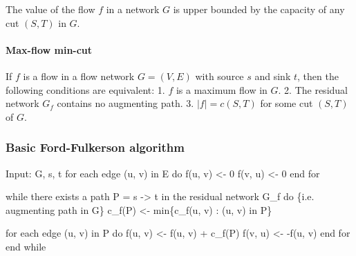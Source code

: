 \documentclass[11pt]{article}
\newenvironment{Shaded}{}{}
\newcommand{\NormalTok}[1]{{#1}}
\begin{document}
The value of the flow \(f\) in a network \(G\) is upper bounded by the
capacity of any cut \((S, T)\) in \(G\).

    \paragraph{Max-flow min-cut}\label{max-flow-min-cut}

If \(f\) is a flow in a flow network \(G = (V, E)\) with source \(s\)
and sink \(t\), then the following conditions are equivalent: 1. \(f\)
is a maximum flow in \(G\). 2. The residual network \(G_f\) contains no
augmenting path. 3. \(|f| = c(S,T)\) for some cut \((S,T)\) of \(G\).

    \subsubsection{Basic Ford-Fulkerson
algorithm}\label{basic-ford-fulkerson-algorithm}

\begin{Shaded}
\begin{Highlighting}[]
\NormalTok{Input: G, s, t}
\NormalTok{    for each edge (u, v) in E do}
\NormalTok{        f(u, v) \textless{}{-} 0}
\NormalTok{        f(v, u) \textless{}{-} 0}
\NormalTok{    end for}

\NormalTok{    while there exists a path P = s {-}\textgreater{} t in the residual network G\_f do}
\NormalTok{        \{i.e. augmenting path in G\}}
\NormalTok{        c\_f(P) \textless{}{-} min\{c\_f(u, v) : (u, v) in P\}}

\NormalTok{        for each edge (u, v) in P do}
\NormalTok{            f(u, v) \textless{}{-} f(u, v) + c\_f(P)}
\NormalTok{            f(v, u) \textless{}{-} {-}f(u, v)}
\NormalTok{        end for}
\NormalTok{    end while}
\end{Highlighting}
\end{Shaded}
\end{document}
